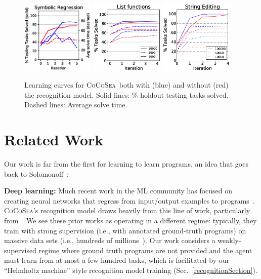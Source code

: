 \documentclass{article}
\newcommand{\system}{\textsc{CoCoSea}~}
\newcommand{\systemEnding}{\textsc{CoCoSea}}
\begin{document}
\begin{figure}\centering
\includegraphics[width = 3.5cm]{figures/rationalCurve.eps} 
  \includegraphics[width = 3.5cm]{figures/list.eps}
  \includegraphics[width = 3.5cm]{figures/textLearningCurve.eps}        
  \caption{Learning curves for \system both with (blue) and without (red) the recognition model. Solid lines: \% holdout testing tasks solved. Dashed lines: Average solve time.}\label{learningCurves} 
\end{figure}

\section{Related Work}
 Our work is far from the first for learning to learn programs,
 an idea that goes back to Solomonoff~\cite{solomonoff1989system}:

 \noindent \textbf{Deep learning:} Much recent work in the ML community has
 focused on creating neural networks that regress from
 input/output examples to programs~\cite{devlin2017robustfill,devlin2017neural,menon2013machine,balog2016deepcoder}. %
\systemEnding's recognition model draws heavily from this line of work, particularly from~\cite{menon2013machine}.
We see these prior works as operating in a different regime: typically, they train with strong supervision (i.e., with annotated ground-truth programs) on massive data sets (i.e., hundreds of millions~\cite{devlin2017robustfill}).
 Our work   considers a weakly-supervised regime where ground truth programs are not provided and
 the agent must learn from at most a few hundred tasks,
 which is facilitated by our ``Helmholtz machine'' style recognition model training (Sec.~\ref{recognitionSection}).
 
\end{document}
